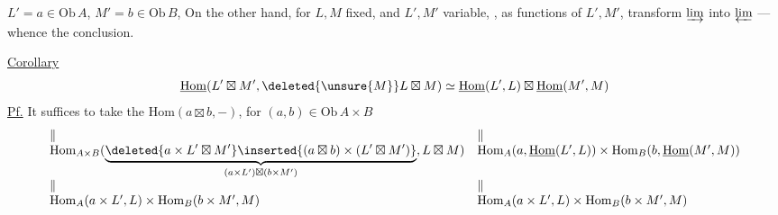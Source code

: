 $L'=a\in\mathrm{Ob}\,A$, $M'=b\in\mathrm{Ob}\,B$,  On the other hand, for $L,M$ fixed, and $L',M'$ variable, , as functions of $L',M'$, transform $\varinjlim$ into $\varprojlim$
 
--- whence the conclusion.

\uline{Corollary}
\[
\underline{\mathrm{Hom}}(L'\boxtimes M',\deleted{\unsure{M}}L\boxtimes M)\simeq\underline{\mathrm{Hom}}(L',L)\boxtimes\underline{\mathrm{Hom}}(M',M)
\]
\uline{Pf.} It suffices to take the $\mathrm{Hom}(a\boxtimes b,-)$, for $(a,b)\in\mathrm{Ob}\,A\times B$
\[
\begin{array}{ll}
\Vert&\Vert\\
\mathrm{Hom}_{A\times B}(\underbrace{\deleted{a\times L'\boxtimes M'}\inserted{(a\boxtimes b)\times(L'\boxtimes M')}}_{(a\times L')\boxtimes(b\times M')},L\boxtimes M)&\mathrm{Hom}_A(a,\underline{\mathrm{Hom}}(L',L))\times\mathrm{Hom}_B(b,\underline{\mathrm{Hom}}(M',M))\\
\Vert&\Vert\\
\mathrm{Hom}_A(a\times L',L)\times\mathrm{Hom}_B(b\times M',M)&\mathrm{Hom}_A(a\times L',L)\times\mathrm{Hom}_B(b\times M',M)
\end{array}
\]
